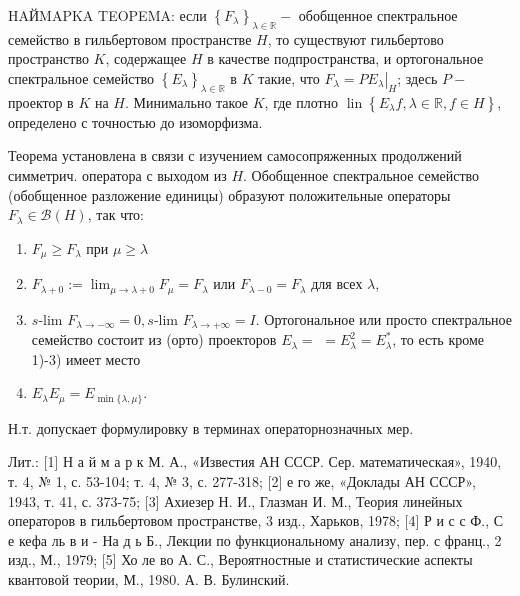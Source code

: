 \documentclass[10pt]{article}
\begin{document}
HAЙMAPKA TEOPEMA: если $\left\{F_{\lambda}\right\}_{\lambda \in \mathbb{R}}-$ обобщенное спектральное семейство в гильбертовом пространстве $H$, то существуют гильбертово пространство $K$, содержащее $H$ в качестве подпространства, и ортогональное спектральное семейство $\left\{E_{\lambda}\right\}_{\lambda \in \mathbb{R}}$ в $K$ такие, что $F_{\lambda}=\left.P E_{\lambda}\right|_{H}$; здесь $P-$ проектор в $K$ на $H$. Минимально такое $K$, где плотно $\operatorname{lin}\left\{E_{\lambda} f, \lambda \in \mathbb{R}, f \in H\right\}$, определено с точностью до изоморфизма.



Теорема установлена в связи с изучением самосопряженных продолжений симметрич. оператора с выходом из $H$. Обобщенное спектральное семейство (обобщенное разложение единицы) образуют положительные операторы $F_{\lambda} \in \mathscr{B}(H)$, так что:



\begin{enumerate}

  \item $F_{\mu} \geqslant F_{\lambda}$ при $\mu \geqslant \lambda$



  \item $F_{\lambda+0}:=\lim _{\mu \rightarrow \lambda+0} F_{\mu}=F_{\lambda}$ или $F_{\lambda-0}=F_{\lambda}$ для всех $\lambda$,



  \item $s$-lim $F_{\lambda \rightarrow-\infty}=0, s$-lim $F_{\lambda \rightarrow+\infty}=I$. Ортогональное или просто спектральное семейство состоит из (орто) проекторов $E_{\lambda}=$ $=E_{\lambda}^{2}=E_{\lambda}^{*}$, то есть кроме 1)-3) имеет место



  \item $E_{\lambda} E_{\mu}=E_{\min \{\lambda, \mu\}}$.



\end{enumerate}



Н.т. допускает формулировку в терминах операторнозначных мер.



Лит.: [1] Н а й м а р к М. А., «Известия АН СССР. Сер. математическая», 1940, т. 4, № 1, с. 53-104; т. 4, № 3, с. 277-318; [2] е го же, «Доклады АН СССР», 1943, т. 41, с. 373-75; [3] Ахиезер Н. И., Глазман И. М., Теория линейных операторов в гильбертовом пространстве, 3 изд., Харьков, 1978; [4] Р и с с Ф., С е кефа ль в и - На д ь Б., Лекции по функциональному анализу, пер. с франц., 2 изд., М., 1979; [5] Хо ле во А. С., Вероятностные и статистические аспекты квантовой теории, М., 1980. А. В. Булинский.
\end{document}
